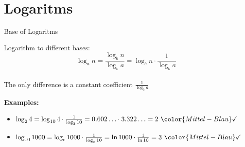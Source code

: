\section{Logaritms}

\begin{frame}{Base of Logaritms}
  \begin{block}{Logarithm to different bases:}
    \begin{displaymath}
      \log_a n = \dfrac{\log_b n}{\log_b a}
      = \log_b n \cdot \dfrac{1}{\log_b a}
    \end{displaymath}\\[0.5em]
    The only difference is a constant coefficient $\frac{1}{\log_b a}$
  \end{block}
  \textbf{Examples:}
  \begin{itemize}
    \item
      \begin{math}
        \log_2 4
        = \log_{10} 4 \cdot \frac{1}{\log_2 10}
        = 0.602 \ldots \cdot 3.322 \ldots
        = 2 ~{\color{Mittel-Blau}\checkmark}
      \end{math}
    \item
      \begin{math}
        \log_{10} 1000
        = \log_{\mathrm{e}} 1000 \cdot \frac{1}{\log_{\mathrm{e}} 10}
        = \ln 1000 \cdot \frac{1}{\ln 10}
        = 3 ~{\color{Mittel-Blau}\checkmark}
      \end{math}
  \end{itemize}
\end{frame}


